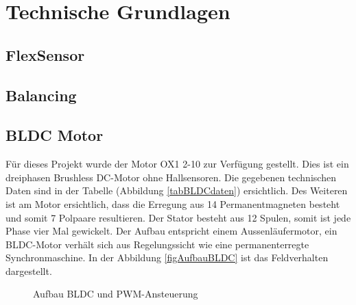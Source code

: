 \chapter{Technische Grundlagen}
\label{TechnischeGrundlagen}
\section{FlexSensor}
\label{tGl_FlexSensor}
\section{Balancing}
\label{tGl_Balancing}
\section{BLDC Motor}
\label{tGl_BLDC}

Für dieses Projekt wurde der Motor OX1 2-10 zur Verfügung gestellt. Dies ist ein dreiphasen Brushless DC-Motor ohne Hallsensoren. Die gegebenen technischen Daten sind in der Tabelle (Abbildung \ref{tabBLDCdaten}) ersichtlich. 
Des Weiteren ist am Motor ersichtlich, dass die Erregung aus 14 Permanentmagneten besteht und somit 7 Polpaare resultieren. Der Stator besteht aus 12 Spulen, somit ist jede Phase vier Mal gewickelt.
Der Aufbau entspricht einem Aussenläufermotor, ein BLDC-Motor verhält sich aus Regelungssicht wie eine permanenterregte Synchronmaschine. In der Abbildung \ref{figAufbauBLDC} ist das Feldverhalten dargestellt.\\

\begin{figure} [H]
	\caption[BLDC Motor]{Aufbau BLDC und PWM-Ansteuerung}
	\label{fig:BLDC}
\end{figure}

